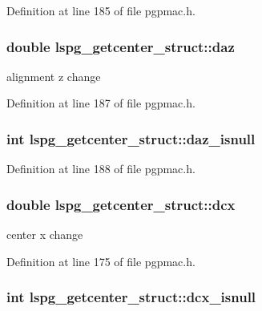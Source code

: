 Definition at line 185 of file pgpmac.\-h.

\hypertarget{structlspg__getcenter__struct_a1170bab2161f03ab29c39f79519ed9ae}{
\subsubsection[{daz}]{\setlength{\rightskip}{0pt plus 5cm}double lspg\-\_\-getcenter\-\_\-struct\-::daz}}\label{structlspg__getcenter__struct_a1170bab2161f03ab29c39f79519ed9ae}


alignment z change 



Definition at line 187 of file pgpmac.\-h.

\hypertarget{structlspg__getcenter__struct_a36742b6bd0f4bf9356414930ba893617}{
\subsubsection[{daz\-\_\-isnull}]{\setlength{\rightskip}{0pt plus 5cm}int lspg\-\_\-getcenter\-\_\-struct\-::daz\-\_\-isnull}}\label{structlspg__getcenter__struct_a36742b6bd0f4bf9356414930ba893617}


Definition at line 188 of file pgpmac.\-h.

\hypertarget{structlspg__getcenter__struct_ade0534056296e9ed568404c538be9227}{
\subsubsection[{dcx}]{\setlength{\rightskip}{0pt plus 5cm}double lspg\-\_\-getcenter\-\_\-struct\-::dcx}}\label{structlspg__getcenter__struct_ade0534056296e9ed568404c538be9227}


center x change 



Definition at line 175 of file pgpmac.\-h.

\hypertarget{structlspg__getcenter__struct_aa404da85af654998f039c81a77626748}{
\subsubsection[{dcx\-\_\-isnull}]{\setlength{\rightskip}{0pt plus 5cm}int lspg\-\_\-getcenter\-\_\-struct\-::dcx\-\_\-isnull}}\label{structlspg__getcenter__struct_aa404da85af654998f039c81a77626748}


